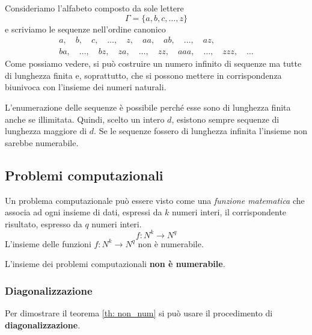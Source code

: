 \begin{example}
	Consideriamo l'alfabeto composto da sole lettere
	\[ \Gamma = \{ a, b, c, \dots, z \} \]
	e scriviamo le sequenze nell'ordine canonico
	\begin{gather*}
		a, \quad b, \quad c, \quad \dots, \quad z, \quad aa, \quad ab, \quad \dots, \quad az, \\
		ba, \quad \dots, \quad bz, \quad za, \quad \dots, \quad zz, \quad aaa, \quad \dots, \quad zzz, \quad \dots
	\end{gather*}
	Come possiamo vedere, si pu\`o costruire un numero infinito di sequenze ma tutte di lunghezza finita e, soprattutto,
	che si possono mettere in corrispondenza biunivoca con l'insieme dei numeri naturali.
\end{example}

\begin{observation}
	L'enumerazione delle sequenze \`e possibile perch\'e esse sono di lunghezza finita anche se illimitata. Quindi,
	scelto un intero $d$, esistono sempre sequenze di lunghezza maggiore di $d$. Se le sequenze fossero di lunghezza
	infinita l'insieme non sarebbe numerabile.
\end{observation}


\subsection{Problemi computazionali}
Un problema computazionale pu\`o essere visto come una \emph{funzione matematica} che associa ad ogni insieme di dati,
espressi da $k$ numeri interi, il corrispondente risultato, espresso da $q$ numeri interi.
\[ f : N^k \rightarrow N^q \]
L'insieme delle funzioni $f : N^k \rightarrow N^q$ non \`e numerabile.

\begin{theorem}\label{th: non_num}
	L'insieme dei problemi computazionali \textbf{non \`e numerabile}.
\end{theorem}

\subsubsection{Diagonalizzazione}
Per dimostrare il teorema \ref{th: non_num} si pu\`o usare il procedimento di
\textbf{diagonalizzazione}.


